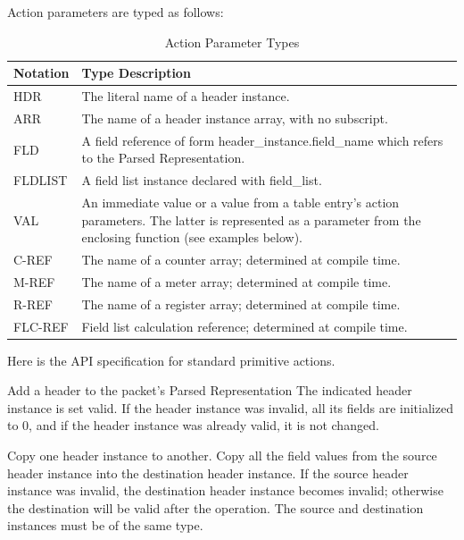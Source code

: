 \documentclass[12pt]{article}
\begin{document}
Action parameters are typed as follows:

\begin{table}[H]
\begin{center}
\begin{tabular}{| l | p{} |} \hline
\textbf{Notation} &
\textbf{Type Description} \\ \hline
HDR &
The literal name of a header instance. \\ \hline
ARR &
The name of a header instance array, with no subscript. \\ \hline
FLD &
A field reference of form header_instance.field_name which refers to the Parsed Representation. \\ \hline
FLDLIST &
A field list instance declared with field_list. \\ \hline
VAL &
An immediate value or a value from a table entry's action parameters. The latter is represented as a parameter from the enclosing function (see examples below). \\ \hline
C-REF &
The name of a counter array; determined at compile time. \\ \hline
M-REF &
The name of a meter array; determined at compile time. \\ \hline
R-REF &
The name of a register array; determined at compile time. \\ \hline
FLC-REF &
Field list calculation reference; determined at compile time. \\ \hline
\end{tabular}
\end{center}
\caption{Action Parameter Types}
\label{tab:actionparamtypes}
\end{table}


Here is the API specification for standard primitive actions.


{ %
Add a header to the packet's Parsed Representation
}
{ %
}
{ %
The indicated  header instance is set valid. If the header instance was invalid, all its 
fields are initialized to 0, and if the header instance was already valid, it is 
not changed. 
}


{ %
Copy one header instance to another.
}
{ %
}
{ %
Copy all the field values from the source header instance into the destination 
header instance. If the source header instance was invalid, the destination 
header instance becomes invalid; otherwise the destination will be valid 
after the operation. The source and destination instances must be of the 
same type.
}
\end{document}
